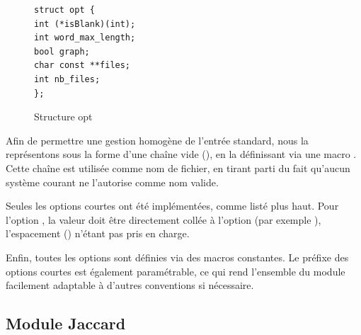 \documentclass[a4paper, 12pt]{article}
\newcommand{\code}{\commandbox}
\begin{document}
\begin{figure}[h]
\centering
\begin{tcolorbox}[center upper,
enhanced,
colback=darkWhite,
boxrule=0pt,
frame hidden,
width=0.5\textwidth]
\begin{lstlisting}[style=bigCode]
struct opt {
int (*isBlank)(int);
int word_max_length;
bool graph;
char const **files;
int nb_files;
};
\end{lstlisting}
\end{tcolorbox}
\caption{Structure opt}
\label{fig:structure_opt}
\end{figure}

Afin de permettre une gestion homogène de l’entrée standard, nous la représentons sous la forme d’une chaîne vide (\code{""}), en la définissant via une macro \code{STDIN}. Cette chaîne est utilisée comme nom de fichier, en tirant parti du fait qu’aucun système courant ne l’autorise comme nom valide.

Seules les options courtes ont été implémentées, comme listé plus haut. Pour l’option \code{-iVALUE}, la valeur doit être directement collée à l’option (par exemple \code{-i3}), l’espacement (\code{-i 3}) n’étant pas pris en charge.

Enfin, toutes les options sont définies via des macros constantes. Le préfixe des options courtes est également paramétrable, ce qui rend l’ensemble du module facilement adaptable à d’autres conventions si nécessaire.
\subsection{Module Jaccard}
\end{document}
